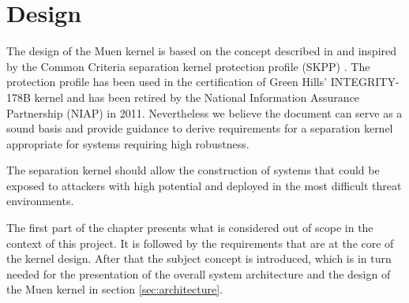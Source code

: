 \chapter{Design}\label{chap:design}
The design of the Muen kernel is based on the concept described in
\cite{TAU0} and inspired by the Common Criteria separation kernel protection
profile (SKPP) \cite{SKPP}. The protection profile has been used in
the certification of Green Hills' INTEGRITY-178B kernel and has been retired by
the National Information Assurance Partnership (NIAP) in 2011. Nevertheless we
believe the document can serve as a sound basis and provide guidance to derive
requirements for a separation kernel appropriate for systems requiring high
robustness.

The separation kernel should allow the construction of systems that could be
exposed to attackers with high potential and deployed in the most difficult
threat environments.

The first part of the chapter presents what is considered out of scope in the
context of this project. It is followed by the requirements that are at the core
of the kernel design. After that the subject concept is introduced, which is in
turn needed for the presentation of the overall system architecture and the
design of the Muen kernel in section \ref{sec:architecture}.





